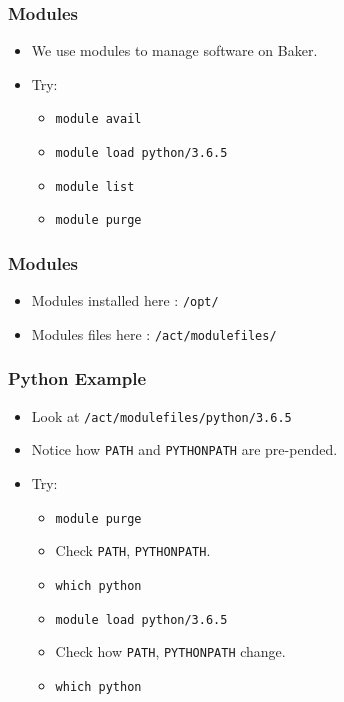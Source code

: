 \documentclass{beamer}
\newcommand{\code}[1]{\colorbox{codegray}{\texttt{#1}}}
\begin{document}
\begin{frame}
\frametitle{Modules}
\begin{itemize}
    \item We use modules to manage software on Baker.
    \pause
    \bigskip
    \item Try:
    \pause
    \begin{itemize}
        \item \code{module avail}
        \bigskip
        \pause
        \item \code{module load python/3.6.5}
        \bigskip
        \pause
        \item \code{module list}
        \bigskip
        \pause
        \item \code{module purge}
    \end{itemize}
\end{itemize}
\end{frame}


\begin{frame}
\frametitle{Modules}
\begin{itemize}
    \item Modules installed here : \code{/opt/}
    \pause
    \bigskip
    \item Modules files here : \code{/act/modulefiles/}
\end{itemize}
\end{frame}






\begin{frame}
\frametitle{Python Example}
\begin{itemize}
    \item Look at \code{/act/modulefiles/python/3.6.5}
    \pause
    \item Notice how \code{PATH} and \code{PYTHONPATH} are pre-pended.
    \pause
    \item Try:
    \begin{itemize}
        \item \code{module purge}
        \pause
        \item Check \code{PATH}, \code{PYTHONPATH}.
        \pause
        \item \code{which python}
        \pause
        \item \code{module load python/3.6.5}
        \pause
        \item Check how \code{PATH}, \code{PYTHONPATH} change.
        \pause
        \item \code{which python}
    \end{itemize}
\end{itemize}
\end{frame}
\end{document}
